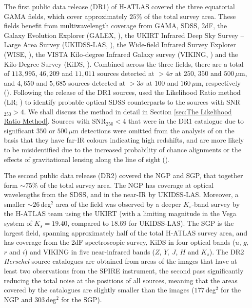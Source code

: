 The first public data release (DR1) of H-ATLAS covered the three equatorial GAMA fields, which cover approximately $25\%$ of the total survey area. These fields benefit from multiwavelength coverage from GAMA, SDSS, 2dF, the Galaxy Evolution Explorer (GALEX, \citealt{Martin_2005}), the UKIRT Infrared Deep Sky Survey -- Large Area Survey (UKIDSS-LAS, \citealt{Lawrence_2007}), the Wide-field Infrared Survey Explorer (WISE, \citealt{Wright_2010}), the VISTA Kilo-degree Infrared Galaxy survey (VIKING, \citealt{Edge_2013}) and the Kilo-Degree Survey (KiDS, \citealt{deJong_2013}). Combined across the three fields, there are a total of $113,995$, $46,209$ and $11,011$ sources detected at $> 4\sigma$ at $250$, $350$ and $500\,\mu$m, and $4,650$ and $5,685$ sources detected at $> 3\sigma$ at $100$ and $160\,\mu$m, respectively (\citealt{Valiante_2016}). Following the release of the DR1 sources, \citealt{Bourne_2016} used the Likelihood Ratio method (LR; \citealt{Sutherland_1992, Ciliegi_2003}) to identify probable optical SDSS counterparts to the sources with SNR$_{250} > 4$. We shall discuss the method in detail in Section \ref{sec:The Likelihood Ratio Method}. Sources with SNR$_{250} < 4$ that were in the DR1 catalogue due to significant $350$ or $500\,\mu$m detections were omitted from the analysis of \citealt{Bourne_2016} on the basis that they have far-IR colours indicating high redshifts, and are more likely to be misidentified due to the increased probability of chance alignments or the effects of gravitational lensing along the line of sight \mbox{(\citealt{Negrello_2010, Pearson_2013, Bourne_2014}).}

The second public data release (DR2) covered the NGP and SGP, that together form $\sim 75\%$ of the total survey area. The NGP has coverage at optical wavelengths from the SDSS, and in the near-IR by UKIDSS-LAS. Moreover, a smaller $\sim26\,$deg$^2$ area of the field was observed by a deeper $K_s$-band survey by the H-ATLAS team using the UKIRT (with a limiting magnitude in the Vega system of $K_s = 19.40$, compared to $18.69$ for UKIDSS-LAS). The SGP is the largest field, spanning approximately half of the total H-ATLAS survey area, and has coverage from the 2dF spectroscopic survey, KiDS in four optical bands ($u$, $g$, $r$ and $i$) and VIKING in five near-infrared bands ($Z$, $Y$, $J$, $H$ and $K_s$). The DR2 \textit{Herschel} source catalogues are obtained from areas of the images that have at least two observations from the SPIRE instrument, the second pass significantly reducing the total noise at the positions of all sources, meaning that the areas covered by the catalogues are slightly smaller than the images ($177\,$deg$^2$ for the NGP and $303\,$deg$^2$ for the SGP).

